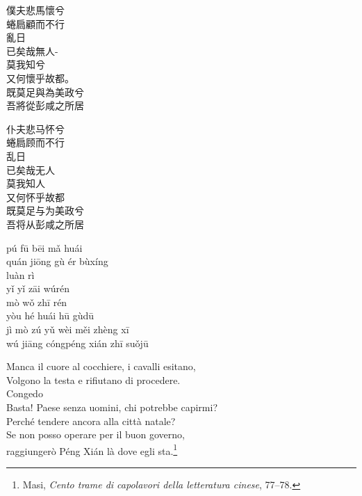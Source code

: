 \documentclass[12pt,titlepage]{article}
\begin{document}
\begin{multicols}{3}
 \begin{CJK*}{UTF8}{gbsn}
 \hspace{-1.5em}僕夫悲馬懷兮\\
 蜷扃顧而不行\\
 亂日\\
 已矣哉無人-\\
 莫我知兮\\
 又何懷乎故都。\\
 既莫足與為美政兮 \\
吾將從彭咸之所居\footnotemark

\end{CJK*}
\columnbreak

 \begin{CJK*}{UTF8}{gbsn}
\hspace{-1.5em}仆夫悲马怀兮\\
 蜷扃顾而不行\\
 乱日\\
已矣哉无人\\
莫我知人\\
 又何怀乎故都\\
既莫足与为美政兮 \\
吾将从彭咸之所居\\
\end{CJK*}
\columnbreak

\hspace{-1.5em}pú fū bēi mǎ huái \\
quán jiōng gù ér bùxíng\\
luàn rì	\\
yǐ yǐ zāi wúrén	\\
mò wǒ zhī rén	\\
yòu hé huái hū gùdū\\
jì mò zú yǔ wèi měi zhèng xī\\
wú jiāng cóngpéng xián zhī suǒjū\\
\columnbreak
\end{multicols}
\vspace{-1.5em}
\begin{center}
Manca il cuore al cocchiere, i cavalli esitano,\\
Volgono la testa e rifiutano di procedere.\\
Congedo\\
Basta! Paese senza uomini, chi potrebbe capirmi?\\
Perché tendere ancora alla città natale?\\
Se non posso operare per il buon governo,\\
raggiungerò Péng Xián là dove egli sta.\footnote{Masi, \emph{Cento trame di capolavori della letteratura cinese}, 77–78.}\\
\end{center}
\end{document}
